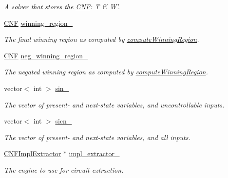 \begin{DoxyCompactItemize}
\begin{DoxyCompactList}\small\item\em A solver that stores the \hyperlink{classCNF}{C\-N\-F}\-: T \& W'. \end{DoxyCompactList}\item 
\hyperlink{classCNF}{C\-N\-F} \hyperlink{classIFM13Synth_a9b05f84db78c1ac1a2a8f74212f66c64}{winning\-\_\-region\-\_\-}
\begin{DoxyCompactList}\small\item\em The final winning region as computed by \hyperlink{classIFM13Synth_a51c6831265e1daf7d0120c0dd954a0c4}{compute\-Winning\-Region}. \end{DoxyCompactList}\item 
\hyperlink{classCNF}{C\-N\-F} \hyperlink{classIFM13Synth_a334e8e6b638c8c57da3db0c3d161231b}{neg\-\_\-winning\-\_\-region\-\_\-}
\begin{DoxyCompactList}\small\item\em The negated winning region as computed by \hyperlink{classIFM13Synth_a51c6831265e1daf7d0120c0dd954a0c4}{compute\-Winning\-Region}. \end{DoxyCompactList}\item 
vector$<$ int $>$ \hyperlink{classIFM13Synth_ac35a6617ca45b2aa1823c99ae7c984a4}{sin\-\_\-}
\begin{DoxyCompactList}\small\item\em The vector of present-\/ and next-\/state variables, and uncontrollable inputs. \end{DoxyCompactList}\item 
vector$<$ int $>$ \hyperlink{classIFM13Synth_abb5b5fc0fe0db0e7aff06d22547e00bd}{sicn\-\_\-}
\begin{DoxyCompactList}\small\item\em The vector of present-\/ and next-\/state variables, and all inputs. \end{DoxyCompactList}\item 
\hyperlink{classCNFImplExtractor}{C\-N\-F\-Impl\-Extractor} $\ast$ \hyperlink{classIFM13Synth_a1d87a79eab422a71fdc23f70d4279cbd}{impl\-\_\-extractor\-\_\-}
\begin{DoxyCompactList}\small\item\em The engine to use for circuit extraction. \end{DoxyCompactList}\end{DoxyCompactItemize}
